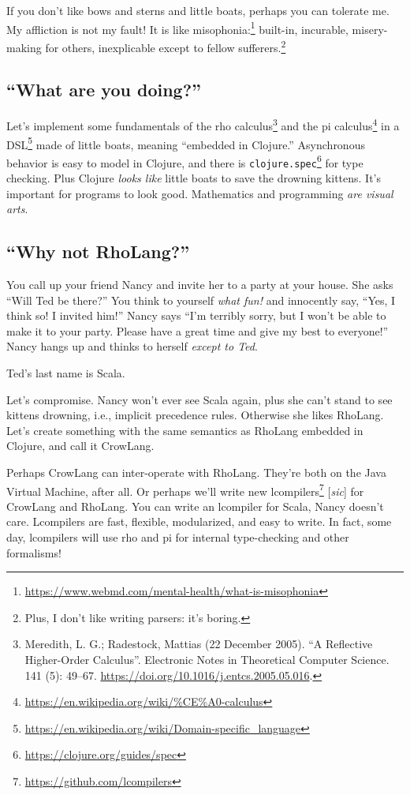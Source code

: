 \documentclass[10pt,oneside,x11names]{article}
\theoremstyle{definition}
\theoremstyle{warning}
\begin{document}
If you don't like bows and sterns and little boats, perhaps you can
tolerate me. My affliction is not my fault! It is like
misophonia:\footnote{\url{https://www.webmd.com/mental-health/what-is-misophonia}}
built-in, incurable, misery-making for others, inexplicable except to fellow
sufferers.\footnote{Plus, I don't like writing parsers: it's boring.}

\subsection{``What are you doing?''}
\label{sec:org3a8b8ba}

Let's implement some fundamentals of the rho calculus\footnote{Meredith, L. G.; Radestock, Mattias (22 December 2005). ``A Reflective Higher-Order Calculus''. Electronic Notes in Theoretical Computer Science. 141 (5): 49–67. \url{https://doi.org/10.1016/j.entcs.2005.05.016}.}
and the pi calculus\footnote{\url{https://en.wikipedia.org/wiki/\%CE\%A0-calculus}\label{orga9f81da}}
in a DSL\footnote{\url{https://en.wikipedia.org/wiki/Domain-specific\_language}}
made of little boats, meaning ``embedded in Clojure.'' Asynchronous
behavior is easy to model in Clojure, and there is
\texttt{clojure.spec}\footnote{\url{https://clojure.org/guides/spec}} for type
checking. Plus Clojure \emph{looks like} little boats to save
the drowning kittens. It's important for programs to look good.
Mathematics and programming \emph{are visual arts}.

\subsection{``Why not RhoLang?''}
\label{sec:orgbfc20c9}

You call up your friend Nancy and invite her to a party at your
house. She asks ``Will Ted be there?'' You think to yourself
\emph{what fun!} and innocently say, ``Yes, I think so! I invited him!''
Nancy says ``I'm terribly sorry, but I won't be able to make it to
your party. Please have a great time and give my best to
everyone!'' Nancy hangs up and thinks to herself \emph{except to Ted}.

Ted's last name is Scala.

Let's compromise. Nancy won't ever see Scala again, plus she can't
stand to see kittens drowning, i.e., implicit precedence rules.
Otherwise she likes RhoLang. Let's create something with the same
semantics as RhoLang embedded in Clojure, and call it CrowLang.

Perhaps CrowLang can inter-operate with RhoLang. They're both on
the Java Virtual Machine, after all. Or perhaps we'll write new
lcompilers\footnote{\url{https://github.com/lcompilers}\label{org93fde74}} [\textit{sic}]
for CrowLang and RhoLang. You can write an lcompiler for Scala, Nancy
doesn't care. Lcompilers are fast, flexible, modularized, and
easy to write. In fact, some day, lcompilers will use rho and pi
for internal type-checking and other formalisms!
\end{document}
